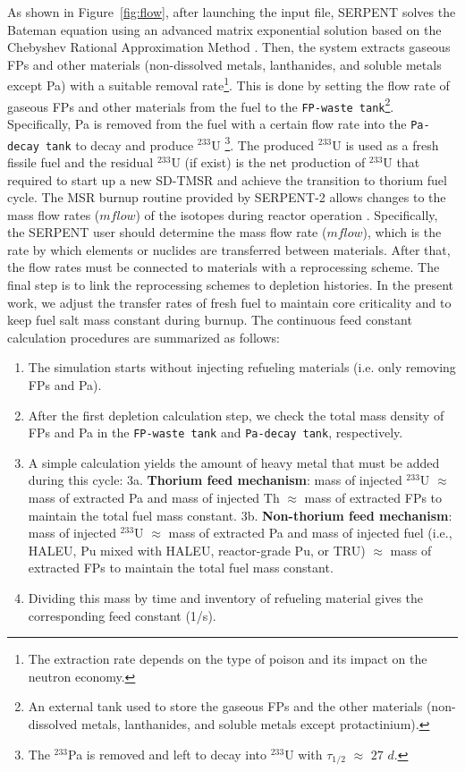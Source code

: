 As shown in Figure~\ref{fig:flow}, after launching the input file, SERPENT solves the Bateman equation using an advanced 
matrix exponential solution based on the Chebyshev Rational Approximation 
Method \cite{isotalo2016improving}. 
Then, the system extracts gaseous \gls{FPs} and other materials 
(non-dissolved metals, lanthanides, and soluble metals except Pa) with 
a suitable removal rate\footnote{The extraction rate depends on the type of 
poison and its impact on the neutron
economy.}. This is done by setting the 
flow rate of gaseous \gls{FPs} and other materials from the fuel to the 
\texttt{FP-waste tank}\footnote{An external tank used to store the gaseous 
\gls{FPs} and the other materials (non-dissolved metals, lanthanides, and 
soluble metals except protactinium).}. Specifically, Pa is removed 
from the fuel with a certain flow rate into the 
\texttt{Pa-decay tank} to decay and produce $^{233}$U \footnote{The 
$^{233}$Pa is removed and left to decay into $^{233}$U with $\tau_{1/2}$ 
$\approx$ $27$ $d$.}. The produced $^{233}$U is used as a fresh fissile fuel 
and the residual $^{233}$U (if exist) is the net production of $^{233}$U that required to start up a new SD-TMSR and achieve the transition to thorium fuel cycle. The MSR burnup 
routine provided by SERPENT-2 allows changes to the mass flow rates ($mflow$) of the 
isotopes during reactor operation \cite{aufiero2013extended}. Specifically, the SERPENT user should determine the mass flow rate ($mflow$), which is the rate by 
which elements or nuclides are transferred between materials. After that, the 
flow rates must be connected to materials with a reprocessing scheme. 
The final step is to link the reprocessing schemes to depletion histories. In 
the present work, we adjust the transfer rates of fresh fuel to maintain core 
criticality and to keep fuel salt mass constant during burnup. The continuous feed constant calculation procedures are summarized as follows:
\begin{enumerate}
	\item The simulation starts without injecting refueling materials (i.e. only removing FPs and Pa).
	\item After the first depletion calculation step, we check the total mass density of FPs and Pa in the \texttt{FP-waste tank} and \texttt{Pa-decay tank}, respectively.
	\item A simple calculation yields the amount of heavy metal that must be added during this cycle:
	\subitem 3a. \textbf{Thorium feed mechanism}: mass of injected $^{233}$U $\approx$ mass of extracted Pa and mass of injected Th $\approx$ mass of extracted FPs to maintain the total fuel mass constant.
	\subitem 3b. \textbf{Non-thorium feed mechanism}: mass of injected $^{233}$U $\approx$ mass of extracted Pa and mass of injected fuel (i.e., HALEU, Pu mixed with HALEU, reactor-grade Pu, or TRU) $\approx$ mass of extracted FPs to maintain the total fuel mass constant.
	\item Dividing this mass by time and inventory of refueling material gives the corresponding feed constant (1/s).
\end{enumerate}
